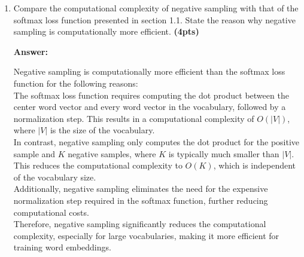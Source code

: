 \documentclass{assignment format}
\newenvironment{answer}{
    {\bf Answer:} \begingroup\color{red}
}{\endgroup}%
\begin{document}
\begin{enumerate}[label=(\alph*)]
\item Compare the computational complexity of negative sampling with that of the softmax loss function presented in section 1.1. State the reason why negative sampling is computationally more efficient. \textbf{(4pts)}

\begin{answer}

Negative sampling is computationally more efficient than the softmax loss function for the following reasons: \\
The softmax loss function requires computing the dot product between the center word vector and every word vector in the vocabulary, followed by a normalization step. This results in a computational complexity of $O(|V|)$, where $|V|$ is the size of the vocabulary. \\
In contrast, negative sampling only computes the dot product for the positive sample and $K$ negative samples, where $K$ is typically much smaller than $|V|$. This reduces the computational complexity to $O(K)$, which is independent of the vocabulary size. \\
Additionally, negative sampling eliminates the need for the expensive normalization step required in the softmax function, further reducing computational costs. \\
Therefore, negative sampling significantly reduces the computational complexity, especially for large vocabularies, making it more efficient for training word embeddings.


\end{answer}
\end{enumerate}
\end{document}
